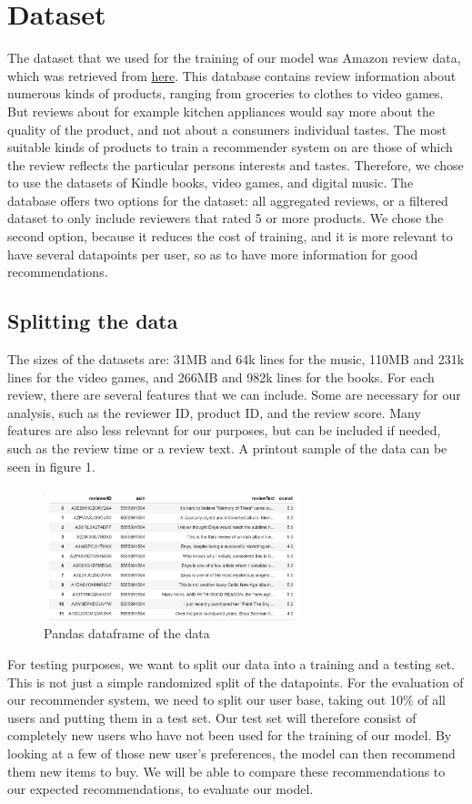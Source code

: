 \documentclass[11pt]{article}
\begin{document}
\section{Dataset}
The dataset that we used for the training of our model was Amazon review data, which was retrieved from \href{http://jmcauley.ucsd.edu/data/amazon/}{here}. This database contains review information about numerous kinds of products, ranging from groceries to clothes to video games. But reviews about for example kitchen appliances would say more about the quality of the product, and not about a consumers individual tastes. The most suitable kinds of products to train a recommender system on are those of which the review reflects the particular persons interests and tastes. Therefore, we chose to use the datasets of Kindle books, video games, and digital music. The database offers two options for the dataset: all aggregated reviews, or a filtered dataset to only include reviewers that rated 5 or more products. We chose the second option, because it reduces the cost of training, and it is more relevant to have several datapoints per user, so as to have more information for good recommendations. 

\subsection{Splitting the data}
The sizes of the datasets are: 31MB and 64k lines for the music, 110MB and 231k lines for the video games, and 266MB and 982k lines for the books. For each review, there are several features that we can include. Some are necessary for our analysis, such as the reviewer ID, product ID, and the review score. Many features are also less relevant for our purposes, but can be included if needed, such as the review time or a review text. A printout sample of the data can be seen in figure 1. 
\begin{figure}
    \includegraphics[width=7.5cm]{Pandas_df_example.png}
    \caption{Pandas dataframe of the data}
\end{figure}

For testing purposes, we want to split our data into a training and a testing set. This is not just a simple randomized split of the datapoints. For the evaluation of our recommender system, we need to split our user base, taking out 10\% of all users and putting them in a test set. Our test set will therefore consist of completely new users who have not been used for the training of our model. By looking at a few of those new user's preferences, the model can then recommend them new items to buy. We will be able to compare these recommendations to our expected recommendations, to evaluate our model.
\end{document}
